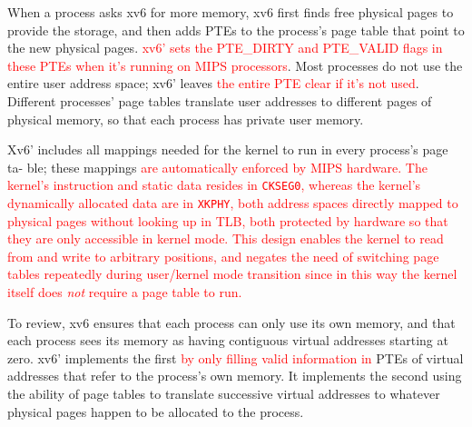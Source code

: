 \documentclass{report}
\def \hilite#1{\textcolor{red}{#1}}
\begin{document}
	When a process asks xv6 for more memory, xv6 first finds free physical pages to
	provide the storage, and then adds PTEs to the process's page table that point to the
	new physical pages. \hilite{xv6' sets the PTE\_DIRTY and PTE\_VALID flags in these PTEs when it's
	running on MIPS processors}. Most
	processes do not use the entire user address space; xv6' leaves \hilite{the entire PTE
	clear if it's not used}. Different processes' page tables translate user addresses to different pages of
	physical memory, so that each process has private user memory.
	
	Xv6' includes all mappings needed for the kernel to run in every process's page ta-
	ble; these mappings \hilite{
		are automatically enforced by MIPS hardware.  The kernel's instruction and static data
		resides in \texttt{CKSEG0}, whereas the kernel's dynamically allocated data are in
		\texttt{XKPHY}, both address spaces directly mapped to physical pages without looking up
		in TLB, both protected by hardware so that they are only accessible in kernel mode.  This design
		enables the kernel to read from and write to arbitrary positions, and negates the need
		of switching page tables repeatedly during user/kernel mode transition since in this way the
		kernel itself does \emph{not} require a page table to run.
	}
	
	To review, xv6 ensures that each process can only use its own memory, and that
	each process sees its memory as having contiguous virtual addresses starting at zero.
	xv6' implements the first \hilite{by only filling valid information in} PTEs of virtual addresses
	that refer to the process's own memory. It implements the second using the ability of
	page tables to translate successive virtual addresses to whatever physical pages happen
	to be allocated to the process.
	
\end{document}
